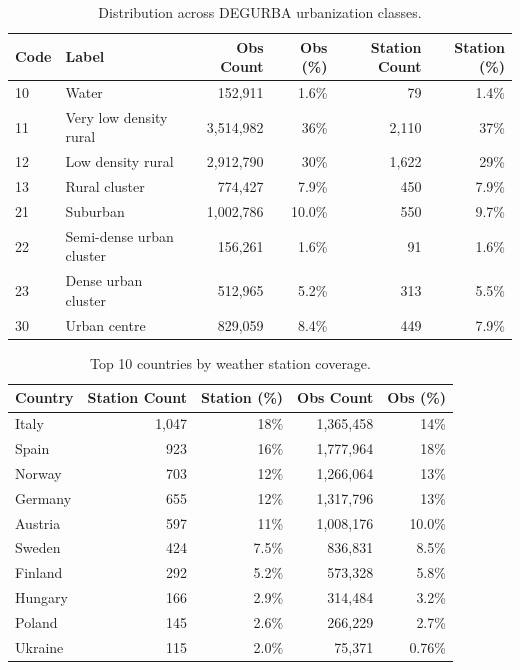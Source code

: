 \documentclass[a4paper,12pt,leqno]{article}
\begin{document}
\begin{table}[htbp]
\centering
\small
\caption{Distribution across DEGURBA urbanization classes.}
\label{tab:desc_degurba}
\begin{tabular}{llrrrr}
\toprule
Code & Label & Obs Count & Obs (\%) & Station Count & Station (\%) \\
\midrule
10 & Water & 152,911 & 1.6\% & 79 & 1.4\% \\
11 & Very low density rural & 3,514,982 & 36\% & 2,110 & 37\% \\
12 & Low density rural & 2,912,790 & 30\% & 1,622 & 29\% \\
13 & Rural cluster & 774,427 & 7.9\% & 450 & 7.9\% \\
21 & Suburban & 1,002,786 & 10.0\% & 550 & 9.7\% \\
22 & Semi-dense urban cluster & 156,261 & 1.6\% & 91 & 1.6\% \\
23 & Dense urban cluster & 512,965 & 5.2\% & 313 & 5.5\% \\
30 & Urban centre & 829,059 & 8.4\% & 449 & 7.9\% \\
\bottomrule
\end{tabular}
\end{table}

\begin{table}[htbp]
\centering
\small
\caption{Top 10 countries by weather station coverage.}
\label{tab:desc_country_top10}
\begin{tabular}{lrrrr}
\toprule
Country & Station Count & Station (\%) & Obs Count & Obs (\%) \\
\midrule
Italy & 1,047 & 18\% & 1,365,458 & 14\% \\
Spain & 923 & 16\% & 1,777,964 & 18\% \\
Norway & 703 & 12\% & 1,266,064 & 13\% \\
Germany & 655 & 12\% & 1,317,796 & 13\% \\
Austria & 597 & 11\% & 1,008,176 & 10.0\% \\
Sweden & 424 & 7.5\% & 836,831 & 8.5\% \\
Finland & 292 & 5.2\% & 573,328 & 5.8\% \\
Hungary & 166 & 2.9\% & 314,484 & 3.2\% \\
Poland & 145 & 2.6\% & 266,229 & 2.7\% \\
Ukraine & 115 & 2.0\% & 75,371 & 0.76\% \\
\bottomrule
\end{tabular}
\end{table}
\end{document}

